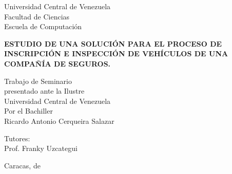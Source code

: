 \begin{center}
	Universidad Central de Venezuela\\
	Facultad de Ciencias\\
	Escuela de Computación\\
	
\end{center}

\vspace{2.5cm}
\begin{center}
	\large{\textbf{ ESTUDIO DE UNA SOLUCIÓN PARA EL PROCESO DE INSCRIPCIÓN E INSPECCIÓN DE VEHÍCULOS DE UNA COMPAÑÍA DE SEGUROS. }}
\end{center}

\vspace{6.0cm}
\begin{center}
	Trabajo de Seminario \\
	presentado ante la Ilustre\\
	Universidad Central de Venezuela\\
	Por el Bachiller\\
	Ricardo Antonio Cerqueira Salazar\\
\end{center}

\begin{center}
	Tutores:\\ Prof. Franky Uzcategui\\
\end{center}

\vspace{1.0cm}
\begin{center}
	Caracas, \monthname[\month] de \the\year
\end{center}